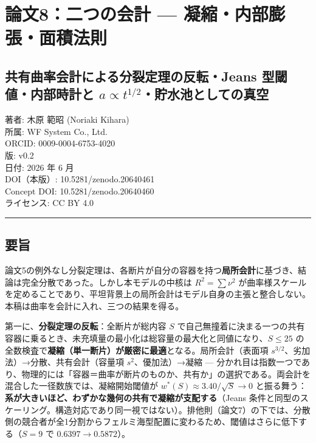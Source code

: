 \documentclass[
]{ltjsarticle}
\author{}
\date{}
\begin{document}
\section{論文8：二つの会計 ---
凝縮・内部膨張・面積法則}\label{ux8ad6ux65878ux4e8cux3064ux306eux4f1aux8a08-ux51ddux7e2eux5185ux90e8ux81a8ux5f35ux9762ux7a4dux6cd5ux5247}

\subsection{\texorpdfstring{共有曲率会計による分裂定理の反転・Jeans
型閾値・内部時計と
\(a\propto t^{1/2}\)・貯水池としての真空}{共有曲率会計による分裂定理の反転・Jeans 型閾値・内部時計と a\textbackslash propto t\^{}\{1/2\}・貯水池としての真空}}\label{ux5171ux6709ux66f2ux7387ux4f1aux8a08ux306bux3088ux308bux5206ux88c2ux5b9aux7406ux306eux53cdux8ee2jeans-ux578bux95beux5024ux5185ux90e8ux6642ux8a08ux3068-apropto-t12ux8cafux6c34ux6c60ux3068ux3057ux3066ux306eux771fux7a7a}

著者: 木原 範昭 (Noriaki Kihara)\\
所属: WF System Co., Ltd.\\
ORCID: 0009-0004-6753-4020\\
版: v0.2\\
日付: 2026 年 6 月\\
DOI（本版）: 10.5281/zenodo.20640461\\
Concept DOI: 10.5281/zenodo.20640460\\
ライセンス: CC BY 4.0

\begin{center}\rule{0.5\linewidth}{0.5pt}\end{center}

\subsection{要旨}\label{ux8981ux65e8}

論文5の例外なし分裂定理は、各断片が自分の容器を持つ\textbf{局所会計}に基づき、結論は完全分散であった。しかし本モデルの中核は
\(R^2=\sum\nu^2\)
が曲率様スケールを定めることであり、平坦背景上の局所会計はモデル自身の主張と整合しない。本稿は曲率を会計に入れ、三つの結果を得る。

第一に、\textbf{分裂定理の反転}：全断片が総内容 \(S\)
で自己無撞着に決まる一つの共有容器に乗るとき、未充填量の最小化は総容量の最大化と同値になり、\(S\le25\)
の全数検査で\textbf{凝縮（単一断片）が厳密に最適}となる。局所会計（表面項
\(s^{3/2}\)、劣加法）→分散、共有会計（容量項 \(s^2\)、優加法）→凝縮 ---
分かれ目は指数一つであり、物理的には「容器＝曲率が断片のものか、共有か」の選択である。両会計を混合した一径数族では、凝縮開始閾値が
\(w^*(S)\approx 3.40/\sqrt S\to0\)
と振る舞う：\textbf{系が大きいほど、わずかな幾何の共有で凝縮が支配する}（Jeans
条件と同型のスケーリング。構造対応であり同一視ではない）。排他則（論文7）の下では、分散側の競合者が全1分割からフェルミ海型配置に変わるため、閾値はさらに低下する（\(S=9\)
で \(0.6397\to0.5872\)）。
\end{document}
